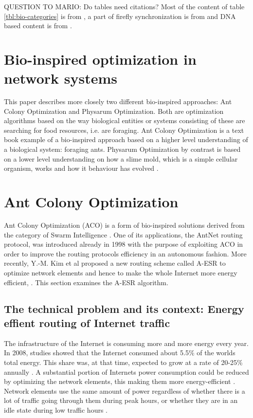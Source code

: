 \documentclass[cameraready]{IWORK2014}
\begin{document}
QUESTION TO MARIO: Do tables need citations?
Most of the content of table \ref{tbl:bio-categories} is from \cite{hylsberg2011bioinspired}, a part of firefly synchronization is from \cite{tyrrell2006fireflies} and DNA based content is from \cite{nazi2014deployment}.

\section{Bio-inspired optimization in network systems}
This paper describes more closely two different bio-inspired approaches: Ant Colony Optimization and Physarum Optimization. Both are optimization algorithms based on the way biological entities or systems consisting of these are searching for food resources, i.e. are foraging. Ant Colony Optimization is a text book example of a bio-inspired approach based on a higher level understanding of a biological system: foraging ants. Physarum Optimization by contrast is based on a lower level understanding on how a slime mold, which is a simple cellular organism, works and how it behaviour has evolved \cite{liu2012physarum}.

\section{Ant Colony Optimization}
Ant Colony Optimization (ACO) is a form of bio-inspired solutions derived from the category of Swarm Intelligence \cite{hylsberg2011bioinspired}. One of its applications, the AntNet routing protocol, was introduced already in 1998 \cite{di1998antnet} with the purpose of exploiting ACO in order to improve the routing protocols efficiency in an autonomous fashion. More recently, Y.-M. Kim et al \cite{kim2012ant} proposed a new routing scheme called A-ESR to optimize network elements and hence to make the whole Internet more energy efficient, \cite{kim2011ant}. This section examines the A-ESR algorithm.

\subsection{The technical problem and its context: Energy effient routing of Internet traffic}
The infrastructure of the Internet is consuming more and more energy every year. In 2008, studies showed that the Internet consumed about 5.5\% of the worlds total energy. This share was, at that time, expected to grow at a rate of 20-25\% annually \cite{proceedings2008energy}. A substantial portion of Internets power consumption could be reduced by optimizing the network elements, this making them more energy-efficient \cite{andrews2010routing}. Network elements use the same amount of power regardless of whether there is a lot of traffic going through them during peak hours, or whether they are in an idle state during low traffic hours \cite{gupta2007using}.
\end{document}
